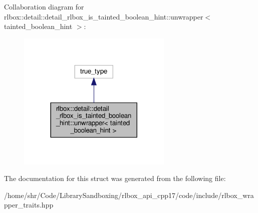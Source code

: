 Collaboration diagram for rlbox\+:\+:detail\+:\+:detail\+\_\+rlbox\+\_\+is\+\_\+tainted\+\_\+boolean\+\_\+hint\+:\+:unwrapper$<$ tainted\+\_\+boolean\+\_\+hint $>$\+:\nopagebreak
\begin{figure}[H]
\begin{center}
\leavevmode
\includegraphics[width=209pt]{structrlbox_1_1detail_1_1detail__rlbox__is__tainted__boolean__hint_1_1unwrapper_3_01tainted__boolean__hint_01_4__coll__graph}
\end{center}
\end{figure}


The documentation for this struct was generated from the following file\+:\begin{DoxyCompactItemize}
\item 
/home/shr/\+Code/\+Library\+Sandboxing/rlbox\+\_\+api\+\_\+cpp17/code/include/rlbox\+\_\+wrapper\+\_\+traits.\+hpp\end{DoxyCompactItemize}

